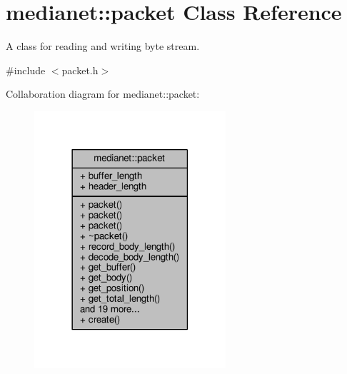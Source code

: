 \hypertarget{classmedianet_1_1packet}{}\section{medianet\+::packet Class Reference}
\label{classmedianet_1_1packet}


A class for reading and writing byte stream.  




{\ttfamily \#include $<$packet.\+h$>$}



Collaboration diagram for medianet\+::packet\+:
\nopagebreak
\begin{figure}[H]
\begin{center}
\leavevmode
\includegraphics[width=201pt]{classmedianet_1_1packet__coll__graph}
\end{center}
\end{figure}
